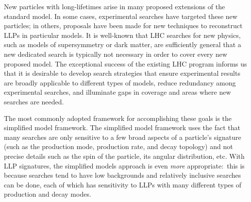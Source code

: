 
New particles with long-lifetimes arise in many proposed extensions of the standard model.  In some cases, experimental searches have targeted these new particles; in others, proposals have been made for new techniques to reconstruct LLPs in particular models.  
It is well-known that LHC searches for new physics, such as models of supersymmetry or dark matter, are sufficiently general that a new dedicated search is typically not necessary in order to cover every new proposed model.  The exceptional success of the existing LHC program informs us that it is desirable to develop search strategies that ensure experimental results are broadly applicable to different types of models, reduce redundancy among experimental searches, and illuminate gaps in coverage and areas where new searches are needed. 

The most commonly adopted framework for accomplishing these goals is the simplified model framework. The simplified model framework uses the fact that many searches are only sensitive to a few broad aspects of a particle's signature (such as the production mode, production rate, and decay topology) and not precise details such as the spin of the particle, its angular distribution, etc. With LLP signatures, the simplified models approach is even \emph{more} appropriate:~this is because searches tend to have low backgrounds and relatively inclusive searches can be done, each of which has sensitivity to LLPs with many different types of production and decay modes.


